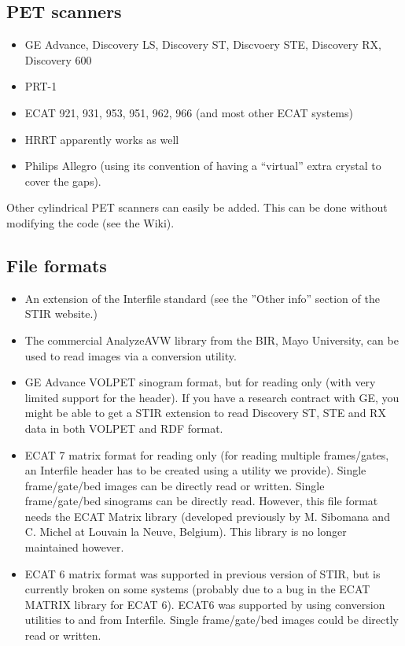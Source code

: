 \documentclass{article}
\begin{document}
\subsection{
PET scanners}
\begin{itemize}
\item 
GE Advance, Discovery LS, Discovery ST, Discvoery STE, Discovery RX,
Discovery 600 
\item 
PRT-1 
\item 
ECAT 921, 931, 953, 951, 962, 966 (and most other ECAT systems) 
\item 
HRRT apparently works as well
\item Philips Allegro (using its convention of having a ``virtual'' extra crystal to cover the gaps).
\end{itemize}

Other cylindrical PET scanners can easily be added. This can be done
without modifying the code (see the Wiki).


\subsection{
File formats}
\begin{itemize}
\item 
An extension of the Interfile standard (see the ''Other info'' section of the STIR website.)
\item 
The commercial AnalyzeAVW library from the BIR, Mayo University, can be used
to read images via a conversion utility.
\item 
GE Advance VOLPET sinogram format, but for reading only (with 
very limited support for the header). If you have a research contract with GE,
you might be able to get a STIR extension to read Discovery ST, STE and RX data in both 
VOLPET and RDF format.
\item 
ECAT 7 matrix format for reading only (for reading multiple
frames/gates, an Interfile 
header has to be created using a utility we provide). Single 
frame/gate/bed images can be directly read or written. Single 
frame/gate/bed sinograms can be directly read.
However, this file format needs the ECAT Matrix library (developed 
previously by M. Sibomana and C. Michel at Louvain la Neuve, Belgium).
This library is no longer maintained however.
\item 
ECAT 6 matrix format was supported in previous version of STIR, but
is currently broken on some systems (probably due to a bug in the ECAT 
MATRIX library for ECAT 6). ECAT6 was supported by using conversion 
utilities to and from 
Interfile. Single frame/gate/bed images could be directly read 
or written.
\end{itemize}
\end{document}
